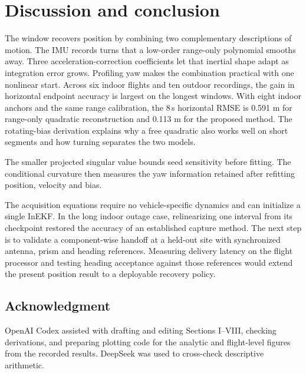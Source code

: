 \documentclass{IEEEtaes}
\begin{document}
\section{Discussion and conclusion}\label{sec:conclusion}
The window recovers position by combining two complementary descriptions of motion. The IMU records turns that a low-order range-only polynomial smooths away. Three acceleration-correction coefficients let that inertial shape adapt as integration error grows. Profiling yaw makes the combination practical with one nonlinear start. Across six indoor flights and ten outdoor recordings, the gain in horizontal endpoint accuracy is largest on the longest windows. With eight indoor anchors and the same range calibration, the 8\,s horizontal RMSE is 0.591 m for range-only quadratic reconstruction and 0.113 m for the proposed method. The rotating-bias derivation explains why a free quadratic also works well on short segments and how turning separates the two models.

The smaller projected singular value bounds seed sensitivity before fitting. The conditional curvature then measures the yaw information retained after refitting position, velocity and bias.

The acquisition equations require no vehicle-specific dynamics and can initialize a single InEKF. In the long indoor outage case, relinearizing one interval from its checkpoint restored the accuracy of an established capture method. The next step is to validate a component-wise handoff at a held-out site with synchronized antenna, prism and heading references. Measuring delivery latency on the flight processor and testing heading acceptance against those references would extend the present position result to a deployable recovery policy.

\begin{samepage}
\section*{Acknowledgment}
OpenAI Codex assisted with drafting and editing Sections I--VIII, checking derivations, and preparing plotting code for the analytic and flight-level figures from the recorded results. DeepSeek was used to cross-check descriptive arithmetic.
\par\end{samepage}

\begingroup
\let\taesbibliography\thebibliography
\renewcommand{\thebibliography}[1]{%
  \taesbibliography{#1}\rightskip=0pt plus 2em\relax
  \interlinepenalty=10000\relax
  \let\taesbibitem\bibitem
  \def\bibitem{\def\newblock{\par\nobreak}\taesbibitem}}


\endgroup
\end{document}
